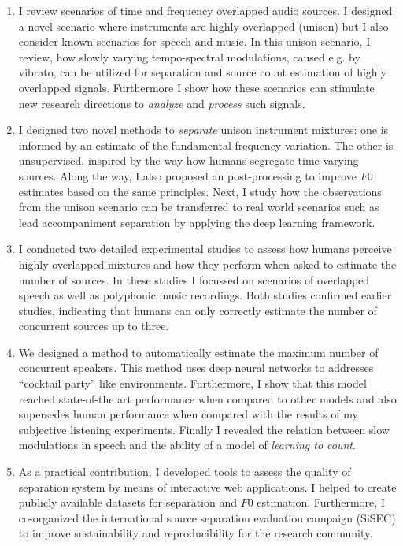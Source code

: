 \begin{enumerate}
\item I review scenarios of time and frequency overlapped audio sources.
I designed a novel scenario where instruments are highly overlapped (unison) but I also consider known scenarios for speech and music.
In this unison scenario, I review, how slowly varying tempo-spectral modulations, caused e.g. by vibrato, can be utilized for separation and source count estimation of highly overlapped signals.
Furthermore I show how these scenarios can stimulate new research directions to \emph{analyze} and \emph{process} such signals.

\item I designed two novel methods to \emph{separate} unison instrument mixtures: one is informed by an estimate of the fundamental frequency variation.
The other is unsupervised, inspired by the way how humans segregate time-varying sources.
Along the way, I also proposed an post-processing to improve \(F0\) estimates based on the same principles.
Next, I study how the observations from the unison scenario can be transferred to real world scenarios such as lead accompaniment separation by applying the deep learning framework.

\item I conducted two detailed experimental studies to assess how humans perceive highly overlapped mixtures and how they perform when asked to estimate the number of sources.
In these studies I focussed on scenarios of overlapped speech as well as polyphonic music recordings.
Both studies confirmed earlier studies, indicating that humans can only correctly estimate the number of concurrent sources up to three.

\item We designed a method to automatically estimate the maximum number of concurrent speakers. This method uses deep neural networks to addresses ``cocktail party'' like environments.
Furthermore, I show that this model reached state-of-the art performance when compared to other models and also supersedes human performance when compared with the results of my subjective listening experiments.
Finally I revealed the relation between slow modulations in speech and the ability of a model of \emph{learning to count}.

\item As a practical contribution, I developed tools to assess the quality of separation system by means of interactive web applications.
I helped to create publicly available datasets for separation and \(F0\) estimation.
Furthermore, I  co-organized the international source separation evaluation campaign (SiSEC) to improve sustainability and reproducibility for the research community.
\end{enumerate}

